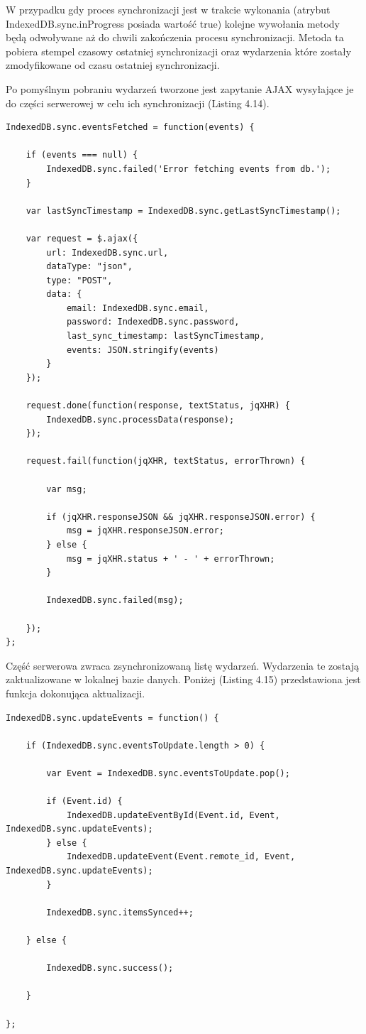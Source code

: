 W przypadku gdy proces synchronizacji jest w trakcie wykonania (atrybut  IndexedDB.sync.inProgress posiada wartość true) kolejne wywołania metody będą odwoływane aż do chwili zakończenia procesu synchronizacji. Metoda ta pobiera stempel czasowy ostatniej synchronizacji oraz wydarzenia które zostały zmodyfikowane od czasu ostatniej synchronizacji.

Po pomyślnym pobraniu wydarzeń tworzone jest zapytanie AJAX wysyłające je do części serwerowej w celu ich synchronizacji (Listing 4.14).

\begin{lstlisting}[style=js, caption=Wysłanie żądania synchronizacji do części serwerowej., label=amb, captionpos=b]
IndexedDB.sync.eventsFetched = function(events) {

	if (events === null) {
    	IndexedDB.sync.failed('Error fetching events from db.');
	}

	var lastSyncTimestamp = IndexedDB.sync.getLastSyncTimestamp();

	var request = $.ajax({
    	url: IndexedDB.sync.url,
    	dataType: "json",
    	type: "POST",
    	data: {
        	email: IndexedDB.sync.email,
        	password: IndexedDB.sync.password,
        	last_sync_timestamp: lastSyncTimestamp,
        	events: JSON.stringify(events)
    	}
	});

	request.done(function(response, textStatus, jqXHR) {
    	IndexedDB.sync.processData(response);
	});

	request.fail(function(jqXHR, textStatus, errorThrown) {

    	var msg;

    	if (jqXHR.responseJSON && jqXHR.responseJSON.error) {
        	msg = jqXHR.responseJSON.error;
    	} else {
        	msg = jqXHR.status + ' - ' + errorThrown;
    	}

    	IndexedDB.sync.failed(msg);

	});
};
\end{lstlisting}

Część serwerowa zwraca zsynchronizowaną listę wydarzeń. Wydarzenia te zostają zaktualizowane w lokalnej bazie danych. Poniżej (Listing 4.15) przedstawiona jest funkcja dokonująca aktualizacji.

\begin{lstlisting}[style=js, caption=Aktualizacja wydarzeń przechowywanych w lokalnej bazie danych., label=amb, captionpos=b]
IndexedDB.sync.updateEvents = function() {

	if (IndexedDB.sync.eventsToUpdate.length > 0) {

    	var Event = IndexedDB.sync.eventsToUpdate.pop();

    	if (Event.id) {
        	IndexedDB.updateEventById(Event.id, Event, IndexedDB.sync.updateEvents);
    	} else {
        	IndexedDB.updateEvent(Event.remote_id, Event, IndexedDB.sync.updateEvents);
    	}

    	IndexedDB.sync.itemsSynced++;

	} else {

    	IndexedDB.sync.success();

	}

};
\end{lstlisting}

